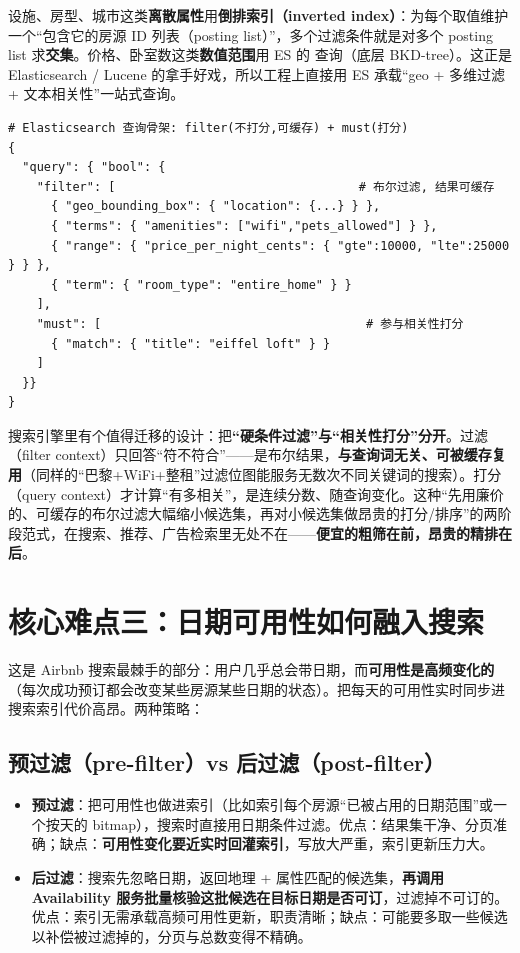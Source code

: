 设施、房型、城市这类\textbf{离散属性}用\textbf{倒排索引（inverted index）}：为每个取值维护一个“包含它的房源 ID 列表（posting list）”，多个过滤条件就是对多个 posting list 求\textbf{交集}。价格、卧室数这类\textbf{数值范围}用 ES 的  查询（底层 BKD-tree）。这正是 Elasticsearch / Lucene 的拿手好戏，所以工程上直接用 ES 承载“geo + 多维过滤 + 文本相关性”一站式查询。

\begin{lstlisting}
# Elasticsearch 查询骨架: filter(不打分,可缓存) + must(打分)
{
  "query": { "bool": {
    "filter": [                                  # 布尔过滤, 结果可缓存
      { "geo_bounding_box": { "location": {...} } },
      { "terms": { "amenities": ["wifi","pets_allowed"] } },
      { "range": { "price_per_night_cents": { "gte":10000, "lte":25000 } } },
      { "term": { "room_type": "entire_home" } }
    ],
    "must": [                                     # 参与相关性打分
      { "match": { "title": "eiffel loft" } }
    ]
  }}
}
\end{lstlisting}

\begin{idea}
搜索引擎里有个值得迁移的设计：把\textbf{“硬条件过滤”与“相关性打分”分开}。过滤（filter context）只回答“符不符合”——是布尔结果，\textbf{与查询词无关、可被缓存复用}（同样的“巴黎+WiFi+整租”过滤位图能服务无数次不同关键词的搜索）。打分（query context）才计算“有多相关”，是连续分数、随查询变化。这种“先用廉价的、可缓存的布尔过滤大幅缩小候选集，再对小候选集做昂贵的打分/排序”的两阶段范式，在搜索、推荐、广告检索里无处不在——\textbf{便宜的粗筛在前，昂贵的精排在后}。
\end{idea}

\section{核心难点三：日期可用性如何融入搜索}

这是 Airbnb 搜索最棘手的部分：用户几乎总会带日期，而\textbf{可用性是高频变化的}（每次成功预订都会改变某些房源某些日期的状态）。把每天的可用性实时同步进搜索索引代价高昂。两种策略：

\subsection{预过滤（pre-filter）vs 后过滤（post-filter）}

\begin{itemize}
  \item \textbf{预过滤}：把可用性也做进索引（比如索引每个房源“已被占用的日期范围”或一个按天的 bitmap），搜索时直接用日期条件过滤。优点：结果集干净、分页准确；缺点：\textbf{可用性变化要近实时回灌索引}，写放大严重，索引更新压力大。
  \item \textbf{后过滤}：搜索先忽略日期，返回地理 + 属性匹配的候选集，\textbf{再调用 Availability 服务批量核验这批候选在目标日期是否可订}，过滤掉不可订的。优点：索引无需承载高频可用性更新，职责清晰；缺点：可能要多取一些候选以补偿被过滤掉的，分页与总数变得不精确。
\end{itemize}

